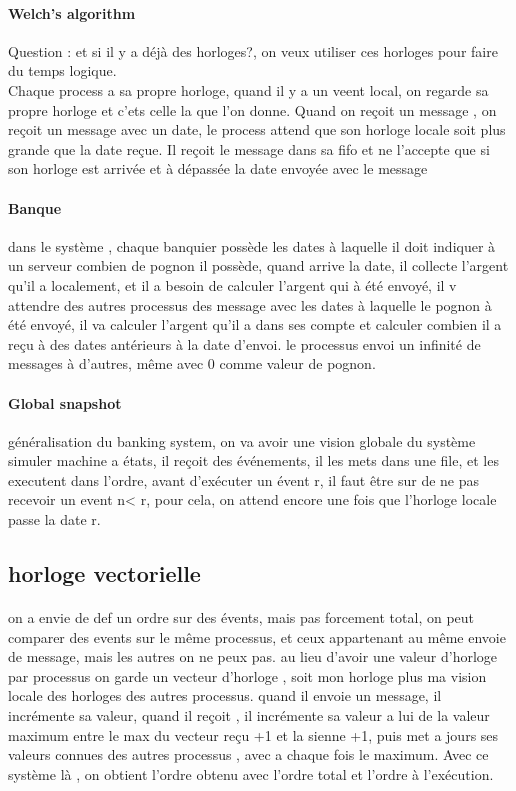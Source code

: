 \documentclass{article}
\begin{document}
\paragraph{Welch's algorithm} Question : et si il y a déjà des horloges?, on veux utiliser ces horloges pour faire du temps logique.\\Chaque process a sa propre horloge, quand il y a un veent local, on regarde sa propre horloge et c'ets celle la que l'on donne. Quand on reçoit un message , on reçoit un message avec un date, le process attend que son horloge locale soit plus grande que la date reçue. Il reçoit le message dans sa fifo et ne l'accepte que si son horloge est arrivée et à dépassée la date envoyée avec le message

\paragraph{Banque} dans le système , chaque banquier possède les dates à laquelle il doit indiquer à un serveur combien de pognon il possède, quand arrive la date, il collecte l'argent qu'il a localement, et il a  besoin de calculer l'argent qui à été envoyé, il v attendre des autres processus des message avec les dates à laquelle le pognon à été envoyé, il va calculer l'argent qu'il a dans ses compte et calculer combien il a reçu à des dates antérieurs à la date d'envoi. le processus envoi un infinité de messages à d'autres, même avec 0 comme valeur de pognon.

\paragraph{Global snapshot} généralisation du banking system, on va avoir une vision globale du système\\ simuler machine a états, il reçoit des événements, il les mets dans une file, et les executent dans l'ordre, avant d'exécuter un évent r, il faut être sur de ne pas recevoir un event  n< r, pour cela, on attend encore une fois que l'horloge locale passe la date r.
\subsection{horloge vectorielle} 
\paragraph{} on a envie de def un ordre sur des évents, mais pas forcement total, on peut comparer des events sur le même processus, et ceux appartenant au même envoie de message, mais les autres on ne peux pas. au lieu d'avoir une valeur d'horloge par processus on garde un vecteur d'horloge , soit mon horloge plus ma vision locale des horloges des autres processus. quand il envoie un message, il incrémente sa valeur, quand il reçoit , il incrémente sa valeur a lui de la valeur maximum entre le max du vecteur reçu +1 et la sienne +1, puis met a jours ses valeurs connues des autres processus , avec a chaque fois le maximum. Avec ce système là , on obtient l'ordre obtenu avec l'ordre total et l'ordre à l’exécution.
\end{document}
